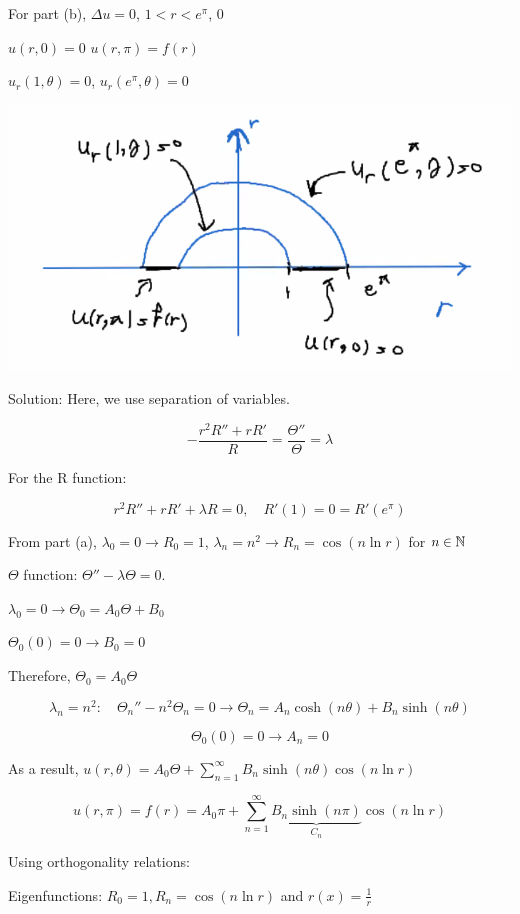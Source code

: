 \documentclass{article}
\begin{document}
\hfill

For part (b), $\Delta u = 0$, $1 < r < e^\pi$, $0 $

$u(r, 0) = 0$ $u(r, \pi) = f(r)$

$u_r(1, \theta) = 0$, $u_r(e^\pi, \theta) = 0$

\begin{center}
    \includegraphics[width = 0.7 \textwidth]{7.png}
\end{center}

Solution: Here, we use separation of variables. 

$$- \frac{r^2 R'' + r R'}{R} = \frac{\Theta''}{\Theta} = \lambda$$

For the R function:

$$r^2 R'' + r R' + \lambda R = 0, \quad R'(1) = 0 = R'(e^\pi)$$

From part (a), $\lambda_0 = 0 \to R_0 = 1$, $\lambda_n = n^2 \to R_n = \cos(n \ln r)$ for $n \in \mathbb{N}$

$\Theta$ function: $\Theta'' - \lambda \Theta = 0$.

$\lambda_0 = 0 \to \Theta_0 = A_0 \Theta + B_0$

$\Theta_0(0) = 0 \to B_0 = 0$

Therefore, $\Theta_0 = A_0 \Theta$

\hfill

$$\lambda_n = n^2: \quad \Theta_n'' - n^2 \Theta_n = 0 \to \Theta_n = A_n \cosh (n \theta) + B_n \sinh(n \theta)$$

$$\Theta_0(0) = 0 \to A_n = 0$$

As a result, $u(r, \theta) = A_0 \Theta + \sum_{n=1}^\infty B_n \sinh(n \theta) \cos(n \ln r)$

\begin{equation}
\label{star}
    u(r, \pi) = f(r) = A_0 \pi + \sum_{n=1}^\infty \underbrace{B_n \sinh(n \pi)}_{C_n} \cos(n \ln r)
\end{equation}

Using orthogonality relations:

Eigenfunctions: $R_0 = 1, R_n = \cos(n \ln r)$ and $r(x) = \frac{1}{r}$
\end{document}
